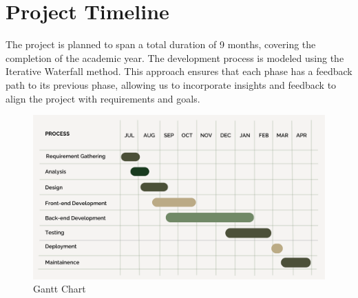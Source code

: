 \section{Project Timeline}
The project is planned to span a total duration of 9 months, covering the completion of the academic year. The development process is modeled using the Iterative Waterfall method. This approach ensures that each phase has a feedback path to its previous phase, allowing us to incorporate insights and feedback to align the project with requirements and goals.

\begin{figure}[h!]
    \centering
    \includegraphics[width=1\textwidth]{Images/Gantt chart.png}
    \caption{Gantt Chart}
    \label{fig:enter-label}
\end{figure}

